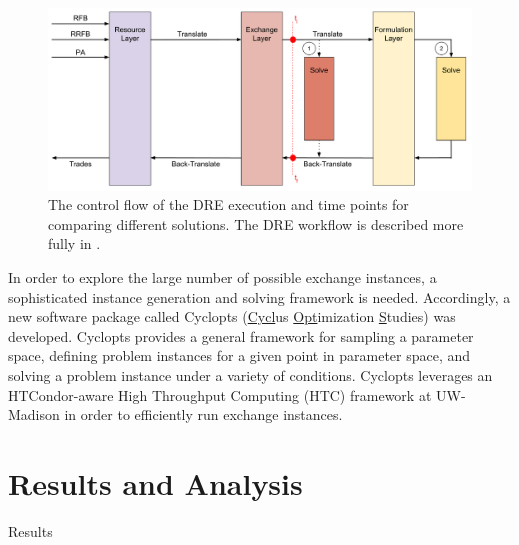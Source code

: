 \documentclass{anstrans}
\begin{document}
\begin{figure}
  \begin{center}
    \includegraphics[width=2\columnwidth]{exchange_xlation_timing.pdf}
    \caption[]{
      \label{fig:dre_time}
      The control flow of the DRE execution and time points for comparing 
      different solutions. The DRE workflow is described more fully in 
      \cite{gidden_agent-based_2013, gidden_agent-based_2014}. }
  \end{center}
\end{figure}

In order to explore the large number of possible exchange instances, a
sophisticated instance generation and solving framework is needed. Accordingly,
a new software package called Cyclopts (\underline{Cycl}us
\underline{Opt}imization \underline{S}tudies) was developed. Cyclopts provides a
general framework for sampling a parameter space, defining problem instances for
a given point in parameter space, and solving a problem instance under a variety
of conditions. Cyclopts leverages an HTCondor-aware High Throughput Computing
(HTC) framework at UW-Madison in order to efficiently run exchange instances. 


\section{Results and Analysis}


Results
\end{document}
